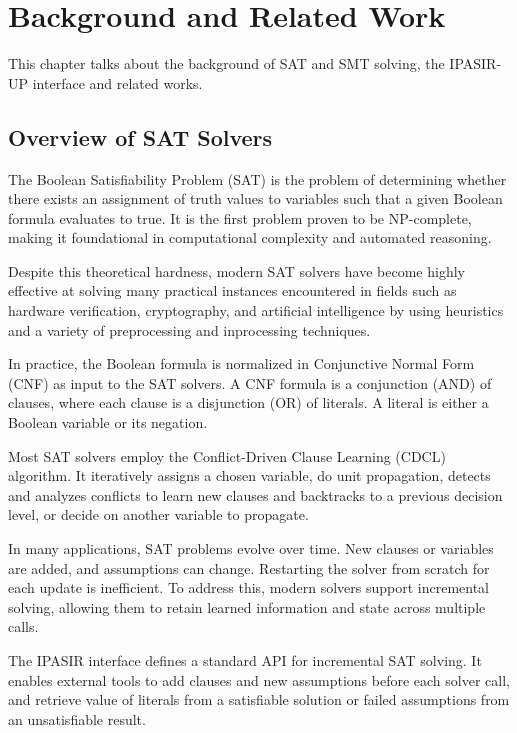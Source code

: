 \chapter{Background and Related Work}

This chapter talks about the background of SAT and SMT solving, the IPASIR-UP interface and related works.

\section{Overview of SAT Solvers}

The Boolean Satisfiability Problem (SAT) is the problem of determining whether there exists an assignment of truth values to variables such that a given Boolean formula evaluates to true. It is the first problem proven to be NP-complete, making it foundational in computational complexity and automated reasoning.

Despite this theoretical hardness, modern SAT solvers have become highly effective at solving many practical instances encountered in fields such as hardware verification, cryptography, and artificial intelligence by using heuristics and a variety of preprocessing and inprocessing techniques.

In practice, the Boolean formula is normalized in Conjunctive Normal Form (CNF) as input to the SAT solvers. A CNF formula is a conjunction (AND) of clauses, where each clause is a disjunction (OR) of literals. A literal is either a Boolean variable or its negation.

Most SAT solvers employ the Conflict-Driven Clause Learning (CDCL) algorithm. It iteratively assigns a chosen variable, do unit propagation, detects and analyzes conflicts to learn new clauses and backtracks to a previous decision level, or decide on another variable to propagate.

In many applications, SAT problems evolve over time. New clauses or variables are added, and assumptions can change. Restarting the solver from scratch for each update is inefficient. To address this, modern solvers support incremental solving, allowing them to retain learned information and state across multiple calls.

The IPASIR interface defines a standard API for incremental SAT solving.  It enables external tools to add clauses and new assumptions before each solver call, and retrieve value of literals from a satisfiable solution or failed assumptions from an unsatisfiable result.

